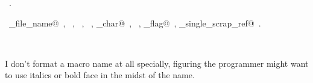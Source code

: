 \documentclass{report}
\begin{document}
\begin{flushleft}
\begin{minipage}{\linewidth}
\footnotesize\addtolength{\baselineskip}{-1ex}
\begin{list}{}{\setlength{\itemsep}{-\parsep}\setlength{\itemindent}{-\leftmargin}}
\item \NWtxtMacroRefIn\ .
\end{list}
\vspace{-2ex}
\footnotesize\addtolength{\baselineskip}{-1ex}
\begin{list}{}{\setlength{\itemsep}{-\parsep}\setlength{\itemindent}{-\leftmargin}}
\item \NWtxtIdentsUsed\nobreak\  \verb@collect_file_name@\nobreak\ , \verb@fprintf@\nobreak\ , \verb@fputs@\nobreak\ , \verb@Name@\nobreak\ , \verb@nw_char@\nobreak\ , \verb@scraps@\nobreak\ , \verb@scrap_flag@\nobreak\ , \verb@write_single_scrap_ref@\nobreak\ .\end{list}
\end{minipage}\\[4ex]
\end{flushleft}
I don't format a macro name at all specially, figuring the programmer
might want to use italics or bold face in the midst of the name.
\end{document}
